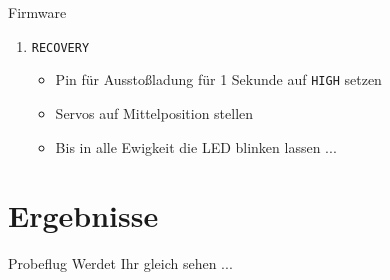 \documentclass{beamer}
\newcounter{saveenumi}
\newcommand{\conti}{\setcounter{enumi}{\value{saveenumi}}}
\begin{document}
\begin{frame}{Firmware}
\begin{enumerate}
\conti
\item \texttt{RECOVERY}
\begin{itemize}
\item Pin für Ausstoßladung für 1 Sekunde auf \texttt{HIGH} setzen
\item Servos auf Mittelposition stellen
\item Bis in alle Ewigkeit die LED blinken lassen ...
\end{itemize}
\end{enumerate}
\end{frame}

\section{Ergebnisse}

\begin{frame}{Probeflug}
Werdet Ihr gleich sehen ...
\end{frame}
\end{document}
